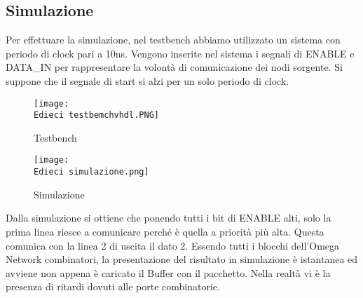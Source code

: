 \documentclass[12pt]{article}
\def \Edieci {Allegati/Esercizio10/}
\begin{document}
\subsection{Simulazione}
Per effettuare la simulazione, nel testbench abbiamo utilizzato un sistema con periodo di clock pari a 10ns. Vengono inserite nel sistema i segnali di ENABLE e DATA\_IN per rappresentare la volontà di comunicazione dei nodi sorgente. Si suppone che il segnale di start si alzi per un solo periodo di clock.
\begin{figure}[ht!]
    \centering
    \texttt{[image: \\Edieci testbemchvhdl.PNG]}
    \caption{Testbench}
\end{figure}
\newpage
\begin{figure}[ht]
    \centering
    \texttt{[image: \\Edieci simulazione.png]}
    \caption{Simulazione}
\end{figure}
Dalla simulazione si ottiene che ponendo tutti i bit di ENABLE alti, solo la prima linea riesce a comunicare perché è quella a priorità più alta. Questa comunica con la linea 2 di uscita il dato 2. Essendo tutti i blocchi dell’Omega Network combinatori, la presentazione del risultato in simulazione è istantanea ed avviene non appena è caricato il Buffer con il pacchetto. Nella realtà vi è la presenza di ritardi dovuti alle porte combinatorie.
\clearpage
\end{document}
